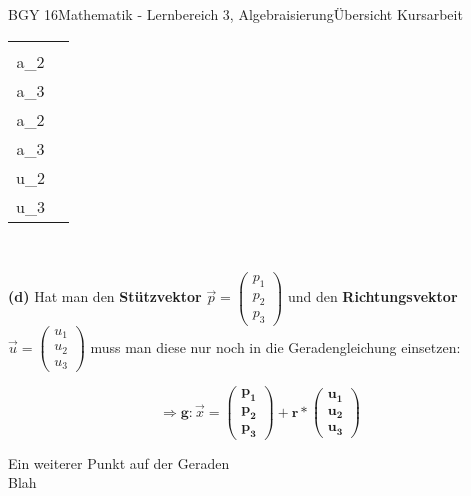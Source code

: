 \documentclass[oneside,openany,headings=optiontotoc,11pt,numbers=noenddot]{scrreprt}
\begin{document}
\begin{worksheet}{BGY 16}{Mathematik - Lernbereich 3, Algebraisierung}{Übersicht Kursarbeit}
\begin{framed}
\begin{tabularx}{\textwidth}{cc}
				\(\vec{p} = \underbrace{\left(\begin{array}{c}a_1\\a_2\\a_3\end{array}\right)}_{Stützvektor}\) & \(\Rightarrow \mathbf{g:} \vec{x} \mathbf{= \left(\begin{array}{c}a_1\\a_2\\a_3\end{array}\right) + r*\left(\begin{array}{c}u_1\\u_2\\u_3\end{array}\right)}\)
			\end{tabularx}\\
			\par\bigskip\noindent
			\textbf{(d)} Hat man den \textbf{Stützvektor} \(\vec{p} = \left(\begin{array}{c}p_1\\p_2\\p_3\end{array}\right)\) und den \textbf{Richtungsvektor} \(\vec{u} = \left(\begin{array}{c}u_1\\u_2\\u_3\end{array}\right)\) muss man diese nur noch in die Geradengleichung einsetzen:\\
			\par\noindent
			\[\Rightarrow \mathbf{g:} \vec{x} \mathbf{= \left(\begin{array}{c}p_1\\p_2\\p_3\end{array}\right) + r*\left(\begin{array}{c}u_1\\u_2\\u_3\end{array}\right)}\]
		\end{framed}
		\begin{framed}
			\tiny{\color{codegray}Ein weiterer Punkt auf der Geraden}\normalcolor\normalsize\\
			Blah
		\end{framed}
	\end{worksheet}
\end{document}
